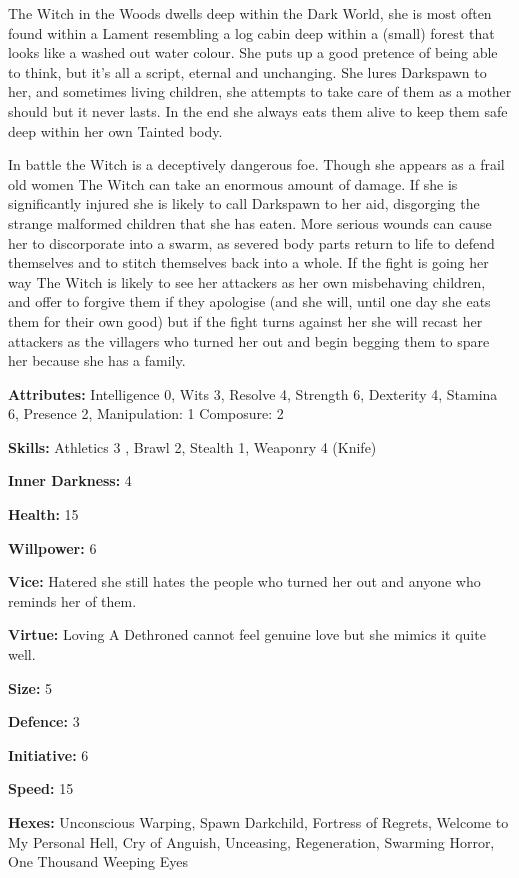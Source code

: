 The Witch in the Woods dwells deep within the Dark World, she is most often found within a Lament resembling a log cabin deep within a (small) forest that looks like a washed out water colour. She puts up a good pretence of being able to think, but it's all a script, eternal and unchanging. She lures Darkspawn to her, and sometimes living children, she attempts to take care of them as a mother should but it never lasts. In the end she always eats them alive to keep them safe deep within her own Tainted body. 

In battle the Witch is a deceptively dangerous foe. Though she appears as a frail old women The Witch can take an enormous amount of damage. If she is significantly injured she is likely to call Darkspawn to her aid, disgorging the strange malformed children that she has eaten. More serious wounds can cause her to discorporate into a swarm, as severed body parts return to life to defend themselves and to stitch themselves back into a whole. If the fight is going her way The Witch is likely to see her attackers as her own misbehaving children, and offer to forgive them if they apologise (and she will, until one day she eats them for their own good) but if the fight turns against her she will recast her attackers as the villagers who turned her out and begin begging them to spare her because she has a family. 

\noindent \textbf{Attributes:} Intelligence 0, Wits 3, Resolve 4, Strength 6, Dexterity 4, Stamina 6, Presence 2, Manipulation: 1 Composure: 2

\noindent \textbf{Skills:} Athletics 3 , Brawl 2, Stealth 1, Weaponry 4 (Knife)

\noindent \textbf{Inner Darkness:} 4

\noindent \textbf{Health:} 15

\noindent \textbf{Willpower:} 6

\noindent \textbf{Vice:} Hatered \textendash she still hates the people who turned her out and anyone who reminds her of them.

\noindent \textbf{Virtue:} Loving \textendash A Dethroned cannot feel genuine love but she mimics it quite well.

\noindent \textbf{Size:} 5

\noindent \textbf{Defence:} 3

\noindent \textbf{Initiative:} 6

\noindent \textbf{Speed:} 15

\noindent \textbf{Hexes:} Unconscious Warping, Spawn Darkchild, Fortress of Regrets, Welcome to My Personal Hell, Cry of Anguish, Unceasing, Regeneration, Swarming Horror, One Thousand Weeping Eyes

